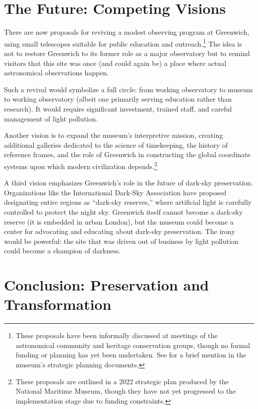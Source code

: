 \section{The Future: Competing Visions}

There are now proposals for reviving a modest observing program at Greenwich, using small telescopes suitable for public education and outreach.\footnote{These proposals have been informally discussed at meetings of the astronomical community and heritage conservation groups, though no formal funding or planning has yet been undertaken. See \textcite{NMM2024prospects} for a brief mention in the museum's strategic planning documents.} The idea is not to restore Greenwich to its former role as a major observatory but to remind visitors that this site was once (and could again be) a place where actual astronomical observations happen.

Such a revival would symbolize a full circle: from working observatory to museum to working observatory (albeit one primarily serving education rather than research). It would require significant investment, trained staff, and careful management of light pollution.

Another vision is to expand the museum's interpretive mission, creating additional galleries dedicated to the science of timekeeping, the history of reference frames, and the role of Greenwich in constructing the global coordinate systems upon which modern civilization depends.\footnote{These proposals are outlined in a 2022 strategic plan produced by the National Maritime Museum, though they have not yet progressed to the implementation stage due to funding constraints.}

A third vision emphasizes Greenwich's role in the future of dark-sky preservation. Organizations like the International Dark-Sky Association have proposed designating entire regions as ``dark-sky reserves,'' where artificial light is carefully controlled to protect the night sky. Greenwich itself cannot become a dark-sky reserve (it is embedded in urban London), but the museum could become a center for advocating and educating about dark-sky preservation. The irony would be powerful: the site that was driven out of business by light pollution could become a champion of darkness.

\section{Conclusion: Preservation and Transformation}

